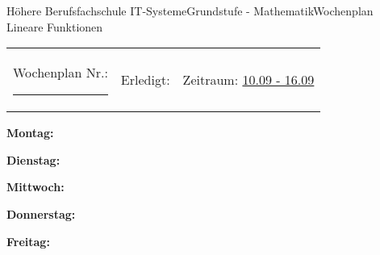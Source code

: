 \documentclass[oneside,openany,headings=optiontotoc,11pt,numbers=noenddot]{scrreprt}
\begin{document}
	\begin{worksheet}{Höhere Berufsfachschule IT-Systeme}{Grundstufe - Mathematik}{Wochenplan Lineare Funktionen}
		\noindent
		\begin{tabularx}{\textwidth}{XXl}
			Wochenplan Nr.: \rule{0.15\textwidth}{1pt} & Erledigt: & Zeitraum: \underline{10.09 - 16.09}
		\end{tabularx}
	
		\begin{framed}
			\noindent
			\textbf{Montag:}
		\end{framed}
		\begin{framed}
			\noindent
			\textbf{Dienstag:}
		\end{framed}
		\begin{framed}
			\noindent
			\textbf{Mittwoch:}
		\end{framed}
		\begin{framed}
			\noindent
			\textbf{Donnerstag:}
		\end{framed}
		\begin{framed}
			\noindent
			\textbf{Freitag:}
		\end{framed}
	\end{worksheet}
\end{document}
